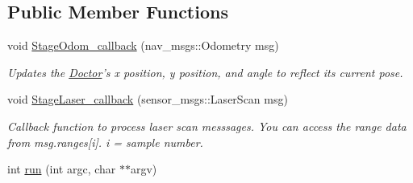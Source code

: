 \subsection*{Public Member Functions}
\begin{DoxyCompactItemize}
\item 
void \hyperlink{classDoctor_a92b20f52198c6137d8858152cba77640}{Stage\-Odom\-\_\-callback} (nav\-\_\-msgs\-::\-Odometry msg)
\begin{DoxyCompactList}\small\item\em Updates the \hyperlink{classDoctor}{Doctor}'s x position, y position, and angle to reflect its current pose. \end{DoxyCompactList}\item 
void \hyperlink{classDoctor_ab0b46ba92bd2069733f304858b7e4495}{Stage\-Laser\-\_\-callback} (sensor\-\_\-msgs\-::\-Laser\-Scan msg)
\begin{DoxyCompactList}\small\item\em Callback function to process laser scan messsages. You can access the range data from msg.\-ranges\mbox{[}i\mbox{]}. i = sample number. \end{DoxyCompactList}\item 
\hypertarget{classDoctor_a1fe9c9a74bd4d2044b7217ec82ae9e60}{int \hyperlink{classDoctor_a1fe9c9a74bd4d2044b7217ec82ae9e60}{run} (int argc, char $\ast$$\ast$argv)}\label{classDoctor_a1fe9c9a74bd4d2044b7217ec82ae9e60}


\end{DoxyCompactItemize}
